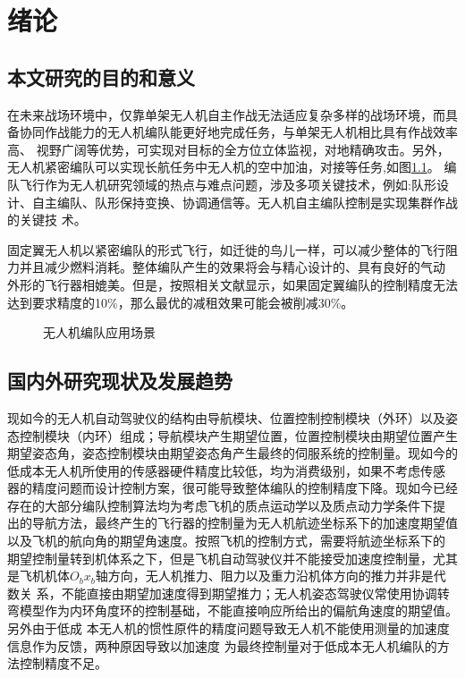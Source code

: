 \chapter{绪论}
\label{chap:intro}
\section{本文研究的目的和意义}
在未来战场环境中，仅靠单架无人机自主作战无法适应复杂多样的战场环境，而具备协同作战能力的无人机编队能更好地完成任务，与单架无人机相比具有作战效率高、
视野广阔等优势，可实现对目标的全方位立体监视，对地精确攻击。另外，无人机紧密编队可以实现长航任务中无人机的空中加油，对接等任务,如图\ref{fig:c01-meaning}。
编队飞行作为无人机研究领域的热点与难点问题，涉及多项关键技术，例如:队形设计、自主编队、队形保持变换、协调通信等。无人机自主编队控制是实现集群作战的关键技
术。

固定翼无人机以紧密编队的形式飞行，如迁徙的鸟儿一样，可以减少整体的飞行阻力并且减少燃料消耗。整体编队产生的效果将会与精心设计的、具有良好的气动
外形的飞行器相媲美。但是，按照相关文献显示，如果固定翼编队的控制精度无法达到要求精度的10\%，那么最优的减租效果可能会被削减30\%。
 \begin{figure}[H]
  \centering
  \caption{无人机编队应用场景}
  \label{fig:c01-meaning}
  \end{figure}
\section{国内外研究现状及发展趋势}
现如今的无人机自动驾驶仪的结构由导航模块、位置控制控制模块（外环）以及姿态控制模块（内环）组成；导航模块产生期望位置，位置控制模块由期望位置产生
期望姿态角，姿态控制模块由期望姿态角产生最终的伺服系统的控制量。现如今的低成本无人机所使用的传感器硬件精度比较低，均为消费级别，如果不考虑传感
器的精度问题而设计控制方案，很可能导致整体编队的控制精度下降。现如今已经存在的大部分编队控制算法均为考虑飞机的质点运动学以及质点动力学条件下提
出的导航方法，最终产生的飞行器的控制量为无人机航迹坐标系下的加速度期望值以及飞机的航向角的期望角速度。按照飞机的控制方式，需要将航迹坐标系下的
期望控制量转到机体系之下，但是飞机自动驾驶仪并不能接受加速度控制量，尤其是飞机机体$O_bx_b$轴方向，无人机推力、阻力以及重力沿机体方向的推力并非是代数关
系，不能直接由期望加速度得到期望推力；无人机姿态驾驶仪常使用协调转弯模型作为内环角度环的控制基础，不能直接响应所给出的偏航角速度的期望值。另外由于低成
本无人机的惯性原件的精度问题导致无人机不能使用测量的加速度信息作为反馈，两种原因导致以加速度
为最终控制量对于低成本无人机编队的方法控制精度不足。

